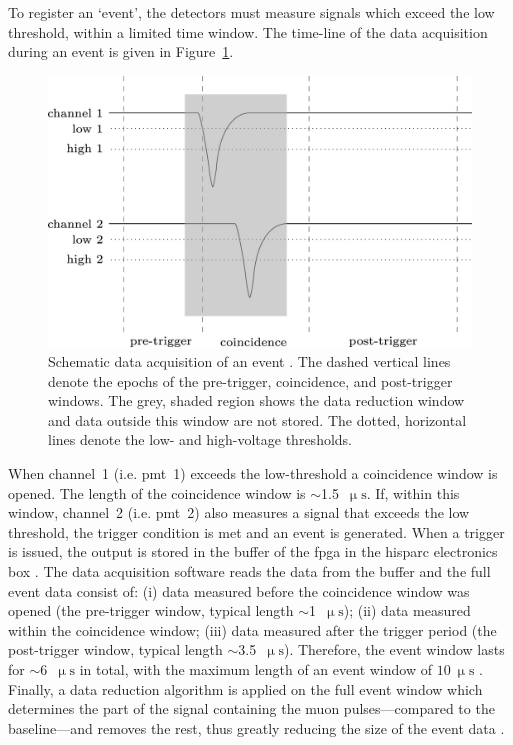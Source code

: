 To register an `event', the detectors must measure signals which exceed the low threshold, within a limited time window. The time-line of the data acquisition during an event is given in Figure~\ref{fig:HS_windows}.

\begin{figure}[ht!]
	\centering
	\includegraphics[width=0.9\columnwidth]{HS_pulses.jpg}
	\caption{Schematic data acquisition of an event \citep{fokkema_hisparc_2012}. The dashed vertical lines denote the epochs of the pre-trigger, coincidence, and post-trigger windows. The grey, shaded region shows the data reduction window and data outside this window are not stored. The dotted, horizontal lines denote the low- and high-voltage thresholds.}
	\label{fig:HS_windows}
\end{figure}

When channel~1 (i.e. \gls{pmt}~1) exceeds the low-threshold a coincidence window is opened. The length of the coincidence window is $\sim$1.5~$\upmu\mathrm{s}$. If, within this window, channel~2 (i.e. \gls{pmt}~2) also measures a signal that exceeds the low threshold, the trigger condition is met and an event is generated. When a trigger is issued, the output is stored in the buffer of the \gls{fpga} in the \gls{hisparc} electronics box \citep{fokkema_hisparc_2012}. The data acquisition software reads the data from the buffer and the full event data consist of: (i) data measured before the coincidence window was opened (the pre-trigger window, typical length $\sim$1~$\upmu\mathrm{s}$); (ii) data measured within the coincidence window; (iii) data measured after the trigger period (the post-trigger window, typical length $\sim$3.5~$\upmu\mathrm{s}$). Therefore, the event window lasts for $\sim$6~$\upmu\mathrm{s}$ in total, with the maximum length of an event window of $10~\upmu\mathrm{s}$ \citep{van_dam_hisparc_2020}. Finally, a data reduction algorithm is applied on the full event window which determines the part of the signal containing the muon pulses---compared to the baseline---and removes the rest, thus greatly reducing the size of the event data \citep{fokkema_hisparc_2012}.



